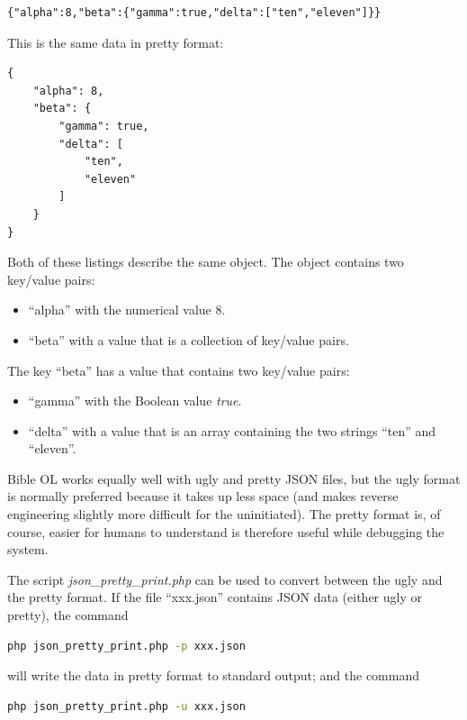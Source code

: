 \documentclass[11pt,oneside,a4paper]{memoir}
\begin{document}
\begin{lstlisting}
{"alpha":8,"beta":{"gamma":true,"delta":["ten","eleven"]}}
\end{lstlisting}

This is the same data in pretty format:

\begin{lstlisting}
{
    "alpha": 8,
    "beta": {
        "gamma": true,
        "delta": [
            "ten",
            "eleven"
        ]
    }
}
\end{lstlisting}

Both of these listings describe the same object. The object contains two key/value pairs:

\begin{itemize}
\item ``alpha'' with the numerical value 8.
\item ``beta'' with a value that is a collection of key/value pairs.
\end{itemize}

The key ``beta'' has a value that contains two key/value pairs:

\begin{itemize}
\item ``gamma'' with the Boolean value \emph{true}.
\item ``delta'' with a value that is an array containing the two strings ``ten'' and ``eleven''.
\end{itemize}


Bible OL works equally well with ugly and pretty JSON files, but the ugly format is normally
preferred because it takes up less space (and makes reverse engineering slightly more difficult for
the uninitiated). The pretty format is, of course, easier for humans to understand is therefore useful
while debugging the system.

The script \emph{json\_pretty\_print.php} can be used to convert
between the ugly and the pretty format. If the file
``xxx.json'' contains JSON data (either ugly or pretty), the command

\begin{lstlisting}[language=bash]
php json_pretty_print.php -p xxx.json
\end{lstlisting}

\noindent
will write the data in pretty format to standard output; and the command

\begin{lstlisting}[language=bash]
php json_pretty_print.php -u xxx.json
\end{lstlisting}
\end{document}
